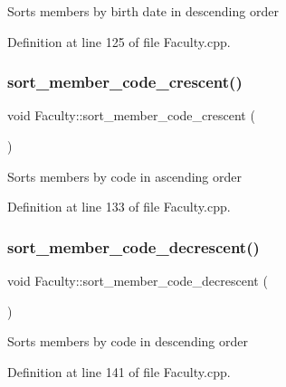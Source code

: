 Sorts members by birth date in descending order 

Definition at line 125 of file Faculty.\+cpp.

\mbox{\label{classFaculty_abc2a6b1d2ef54e397e47839445d57b03}} 
\subsubsection{\texorpdfstring{sort\+\_\+member\+\_\+code\+\_\+crescent()}{sort\_member\_code\_crescent()}}
{\footnotesize\ttfamily void Faculty\+::sort\+\_\+member\+\_\+code\+\_\+crescent (\begin{DoxyParamCaption}{ }\end{DoxyParamCaption})}

Sorts members by code in ascending order 

Definition at line 133 of file Faculty.\+cpp.

\mbox{\label{classFaculty_affc074ff7e6ccca9def97262dc66618e}} 
\subsubsection{\texorpdfstring{sort\+\_\+member\+\_\+code\+\_\+decrescent()}{sort\_member\_code\_decrescent()}}
{\footnotesize\ttfamily void Faculty\+::sort\+\_\+member\+\_\+code\+\_\+decrescent (\begin{DoxyParamCaption}{ }\end{DoxyParamCaption})}

Sorts members by code in descending order 

Definition at line 141 of file Faculty.\+cpp.

